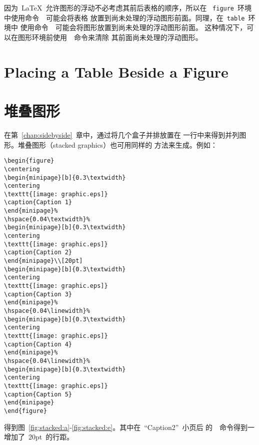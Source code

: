 因为~\LaTeX{}~允许图形的浮动不必考虑其前后表格的顺序，所以在
~\texttt{figure}~环境中使用命令~~可能会将表格
放置到尚未处理的浮动图形前面。同理，在~\texttt{table}~环境中
使用命令~~可能会将图形放置到尚未处理的浮动图形前面。
这种情况下，可以在图形环境前使用~~命令来清除
其前面尚未处理的浮动图形。

\section{Placing a Table Beside a Figure}

\section{堆叠图形}

在第~\ref{chap:sidebyside}~章中，通过将几个盒子并排放置在
一行中来得到并列图形。堆叠图形（stacked graphics）也可用同样的
方法来生成。例如：
\begin{Verbatim}[xleftmargin=1cm]
\begin{figure} 
\centering 
\begin{minipage}[b]{0.3\textwidth} 
\centering 
\texttt{[image: graphic.eps]} 
\caption{Caption 1}
\end{minipage}% 
\hspace{0.04\textwidth}% 
\begin{minipage}[b]{0.3\textwidth} 
\centering 
\texttt{[image: graphic.eps]} 
\caption{Caption 2} 
\end{minipage}\\[20pt] 
\begin{minipage}[b]{0.3\textwidth} 
\centering 
\texttt{[image: graphic.eps]} 
\caption{Caption 3} 
\end{minipage}% 
\hspace{0.04\linewidth}% 
\begin{minipage}[b]{0.3\textwidth} 
\centering 
\texttt{[image: graphic.eps]} 
\caption{Caption 4} 
\end{minipage}% 
\hspace{0.04\linewidth}% 
\begin{minipage}[b]{0.3\textwidth} 
\centering 
\texttt{[image: graphic.eps]} 
\caption{Caption 5} 
\end{minipage} 
\end{figure}
\end{Verbatim}
得到图~\ref{fig:stacked:a}-\ref{fig:stacked:e}。其中在~``Caption2''~小页后
的~\texttt{\bs\bs[20pt]}~命令得到一增加了~20pt~的行距。

